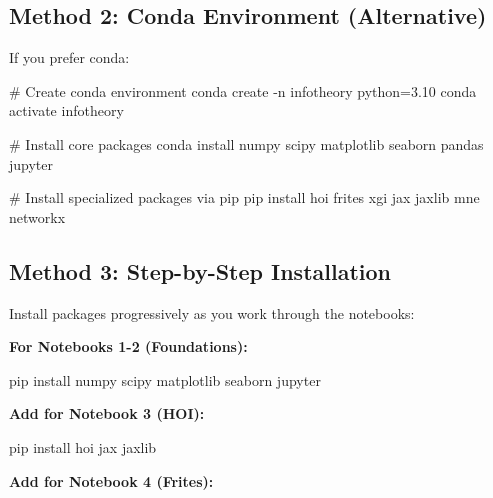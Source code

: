 \documentclass[
  11pt,
  letterpaper,
  oneside,
  openany]{book}
\newenvironment{Shaded}{\begin{snugshade}}{\end{snugshade}}
\newcommand{\AttributeTok}[1]{\textcolor[rgb]{0.40,0.45,0.13}{#1}}
\newcommand{\CommentTok}[1]{\textcolor[rgb]{0.37,0.37,0.37}{#1}}
\newcommand{\ExtensionTok}[1]{\textcolor[rgb]{0.00,0.23,0.31}{#1}}
\newcommand{\NormalTok}[1]{\textcolor[rgb]{0.00,0.23,0.31}{#1}}
\begin{document}
\subsection*{Method 2: Conda Environment
(Alternative)}\label{method-2-conda-environment-alternative}

If you prefer conda:

\begin{Shaded}
\begin{Highlighting}[]
\CommentTok{\# Create conda environment}
\ExtensionTok{conda}\NormalTok{ create }\AttributeTok{{-}n}\NormalTok{ infotheory python=3.10}
\ExtensionTok{conda}\NormalTok{ activate infotheory}

\CommentTok{\# Install core packages}
\ExtensionTok{conda}\NormalTok{ install numpy scipy matplotlib seaborn pandas jupyter}

\CommentTok{\# Install specialized packages via pip}
\ExtensionTok{pip}\NormalTok{ install hoi frites xgi jax jaxlib mne networkx}
\end{Highlighting}
\end{Shaded}

\subsection*{Method 3: Step-by-Step
Installation}\label{method-3-step-by-step-installation}

Install packages progressively as you work through the notebooks:

\textbf{For Notebooks 1-2 (Foundations):}

\begin{Shaded}
\begin{Highlighting}[]
\ExtensionTok{pip}\NormalTok{ install numpy scipy matplotlib seaborn jupyter}
\end{Highlighting}
\end{Shaded}

\textbf{Add for Notebook 3 (HOI):}

\begin{Shaded}
\begin{Highlighting}[]
\ExtensionTok{pip}\NormalTok{ install hoi jax jaxlib}
\end{Highlighting}
\end{Shaded}

\textbf{Add for Notebook 4 (Frites):}
\end{document}
